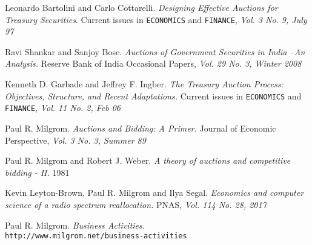 \documentclass[a4paper]{article}
\begin{document}
\pagebreak
\begin{thebibliography}{9}

Leonardo Bartolini and Carlo Cottarelli.
\textit{Designing Effective Auctions for Treasury Securities}. 
Current issues in \texttt{ECONOMICS} and \texttt{FINANCE}, \textit{Vol. 3 No. 9, July 97}

Ravi Shankar and Sanjoy Bose. 
\textit{Auctions of Government Securities in India –An Analysis.}
Reserve Bank of India Occasional Papers,\textit{ Vol. 29 No. 3, Winter 2008}

Kenneth D. Garbade and Jeffrey F. Ingber.
\textit{The Treasury Auction Process: Objectives, Structure, and Recent Adaptations.}
Current issues in \texttt{ECONOMICS} and \texttt{FINANCE}, \textit{Vol. 11 No. 2, Feb 06}

\bibitem{}
Paul R. Milgrom.
\textit{Auctions and Bidding: A Primer.}
Journal of Economic Perspective, \textit{Vol. 3 No. 3, Summer 89}

\bibitem{}
Paul R. Milgrom and Robert J. Weber.
\textit{A theory of auctions and competitive bidding - II.}
1981

\bibitem{}
Kevin Leyton-Brown, Paul R. Milgrom and Ilya Segal.
\textit{Economics and computer science of a radio spectrum reallocation.}
PNAS, \textit{Vol. 114 No. 28, 2017}


Paul R. Milgrom.
\textit{Business Activities.}
\\\texttt{http://www.milgrom.net/business-activities}
\end{thebibliography}
\end{document}
